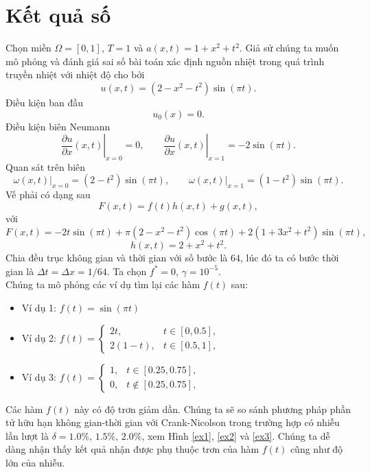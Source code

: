 \documentclass[]{article}
\begin{document}
\section{Kết quả số}
\qquad Chọn miền $\Omega=[0, 1]$, $T=1$ và
$a(x, t)=1+x^2+t^2.$ Giả sử chúng ta muốn mô phỏng và đánh giá sai số bài toán xác định nguồn nhiệt trong quá trình truyền nhiệt với nhiệt độ cho bởi
$$u(x, t)=\left(2-x^2-t^2\right)\sin(\pi t).$$
Điều kiện ban đầu $$u_0(x)=0.$$
Điều kiện biên Neumann $$\left.\frac{\partial u}{\partial x}(x, t)\right|_{x=0}=0,\qquad \left.\frac{\partial u}{\partial x}(x, t)\right|_{x=1}=-2\sin(\pi t).$$
Quan sát trên biên
$$\left.\omega(x, t)\right|_{x=0}=\left(2-t^2\right)\sin(\pi t),\qquad \left.\omega(x, t)\right|_{x=1}=\left(1-t^2\right)\sin(\pi t).$$
Vế phải có dạng sau
$$F(x, t)=f(t)h(x, t)+g(x, t),$$
với 
$$F(x, t)=-2t\sin(\pi t)+\pi\left(2-x^2-t^2\right)\cos(\pi t)+2\left(1+3x^2+t^2\right)\sin(\pi t),$$
$$h(x, t)=2+x^2+t^2.$$
Chia đều trục không gian và thời gian với số bước là $64$, lúc đó ta có bước thời gian là $\Delta t=\Delta x=1/64$. Ta chọn $f^*=0$, $\gamma=10^{-5}$.
\\
Chúng ta mô phỏng các ví dụ tìm lại các hàm $f(t)$ sau:
\begin{itemize}
	\item Ví dụ 1: $f(t)=\sin(\pi t)$
	\item Ví dụ 2: 
	$f(t)=
	\begin{cases}
	2t, & t\in [0, 0.5],\\
	2(1-t), & t \in [0.5, 1],
	\end{cases}$
	\item Ví dụ 3:
	$f(t)=
	\begin{cases}
	1, & t\in [0.25, 0.75],\\
	0, & t \notin [0.25, 0.75],
	\end{cases}$
\end{itemize}
Các hàm $f(t)$ này có độ trơn giảm dần. Chúng ta sẽ so sánh phương pháp phần tử hữu hạn không gian-thời gian với Crank-Nicolson trong trường hợp có nhiễu lần lượt là  $\delta = 1.0\%,\, 1.5\%,\,2.0\%$, xem Hình \ref{ex1}, \ref{ex2} và \ref{ex3}. Chúng ta dễ dàng nhận thấy kết quả nhận được phụ thuộc trơn của hàm $f(t)$ cũng như độ lớn của nhiễu.
\end{document}
